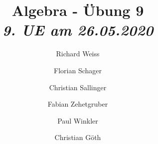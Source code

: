 \documentclass{article}
\title
{
  Algebra - Übung 9 \\
  \vspace{4pt}
  \normalsize
  \textit{9. UE am 26.05.2020}
}
\author
{
  Richard Weiss       \and
  Florian Schager     \and
  Christian Sallinger \and
  Fabian Zehetgruber  \and
  Paul Winkler        \and
  Christian Göth
}
\date{}
\begin{document}
\maketitle


\pagebreak





\end{document}
